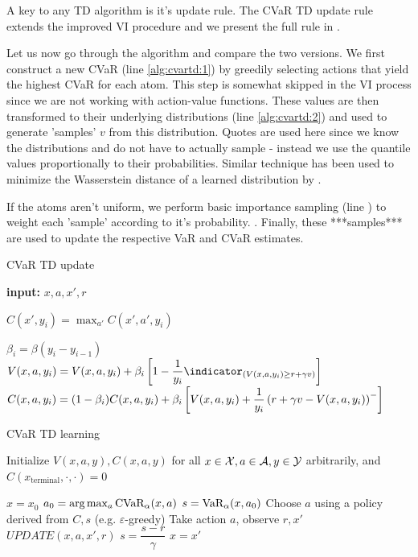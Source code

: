 A key to any TD algorithm is it's update rule. The CVaR TD update rule extends the improved VI procedure and we present the full rule in . 

Let us now go through the algorithm and compare the two versions. We first construct a new CVaR (line \ref{alg:cvartd:1}) by greedily selecting actions that yield the highest CVaR for each atom. This step is somewhat skipped in the VI process since we are not working with action-value functions. These values are then transformed to their underlying distributions (line \ref{alg:cvartd:2}) and used to generate 'samples' $v$ from this distribution. Quotes are used here since we know the distributions and do not have to actually sample - instead we use the quantile values proportionally to their probabilities. Similar technique has been used to minimize the Wasserstein distance of a learned distribution by \citet{dabney2017distributional}.

If the atoms aren't uniform, we perform basic importance sampling (line \label{alg:cvartd:3}) to weight each 'sample' according to it's probability. . Finally, these ***samples*** are used to update the respective VaR and CVaR estimates.


\begin{algorithm}
\caption{CVaR TD update}
\begin{algorithmic}[1]\label{alg:cvartd}

    \STATE \textbf{input:} $x, a, x', r$
    
	\STATE $C(x', y_i) = \max_{a'} C(x', a', y_i)$ \label{alg:cvartd:1}
	\ENDFOR
	
	\STATE {} \label{alg:cvartd:2}

	\STATE $\beta_i = \beta (y_i-y_{i-1})$  \label{alg:cvartd:3}
	\STATE $V(x, a, y_i) = V(x, a, y_i) + \beta_i \bsquare{1 - \dfrac{1}{y_i}\indicator_{(V(x, a, y_i) \ge r+\gamma v)}}$  \label{alg:cvartd:4}
	\STATE $C(x, a, y_i) = (1-\beta_i)C(x, a, y_i) + \beta_i \left[ {V(x, a, y_i) + \dfrac{1}{y_i}\left( {r+\gamma v - V(x, a, y_i)} \right)^-} \right]$  \label{alg:cvartd:5}
	\ENDFOR
	
\end{algorithmic}
\end{algorithm}

\begin{algorithm}
\caption{CVaR TD learning}
\begin{algorithmic}
    \STATE Initialize $V(x, a, y), C(x, a, y)$ for all $x\in\mathcal{X}, a\in\mathcal{A}, y\in\mathcal{Y}$ arbitrarily, and $C(x_\text{terminal}, \cdot, \cdot) = 0$
    
		
	\STATE $x = x_0$
	\STATE $a_0 = \text{arg}\max_a \text{CVaR}_\alpha(x, a)$
	\STATE $s = \text{VaR}_\alpha(x, a_0)$
	\STATE Choose $a$ using a policy derived from $C, s$ (e.g. $\varepsilon$-greedy)
	\STATE Take action $a$, observe $r, x'$
	\STATE $UPDATE(x, a, x', r)$
	\STATE $s = \dfrac{s-r}{\gamma}$
	\STATE $x = x'$
	\ENDWHILE
	
	\ENDFOR
\end{algorithmic}
\end{algorithm}


